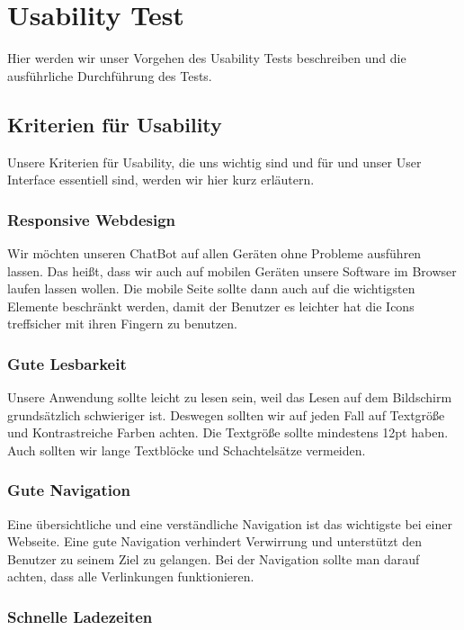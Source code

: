 \section{Usability Test}
Hier werden wir unser Vorgehen des Usability Tests beschreiben und die ausführliche
Durchführung des Tests.

\subsection{Kriterien für Usability}
Unsere Kriterien für Usability, die uns wichtig sind und für und unser User Interface
essentiell sind, werden wir hier kurz erläutern.

\subsubsection{Responsive Webdesign}

\noindent Wir möchten unseren ChatBot auf allen Geräten ohne Probleme ausführen lassen.
Das heißt, dass wir auch auf mobilen Geräten unsere Software im Browser laufen lassen wollen.
Die mobile Seite sollte dann auch auf die wichtigsten Elemente beschränkt werden, damit
der Benutzer es leichter hat die Icons treffsicher mit ihren Fingern zu benutzen.

\subsubsection{Gute Lesbarkeit}

\noindent Unsere Anwendung sollte leicht zu lesen sein, weil das Lesen auf dem Bildschirm
grundsätzlich schwieriger ist. Deswegen sollten wir auf jeden Fall
auf Textgröße und Kontrastreiche Farben achten. Die Textgröße sollte mindestens
12pt haben. Auch sollten wir lange Textblöcke und
Schachtelsätze vermeiden.

\subsubsection{Gute Navigation}

\noindent Eine übersichtliche und eine verständliche Navigation ist das wichtigste bei einer Webseite.
Eine gute Navigation verhindert Verwirrung und unterstützt den Benutzer zu seinem Ziel zu gelangen.
Bei der Navigation sollte man darauf achten, dass alle Verlinkungen funktionieren.

\subsubsection{Schnelle Ladezeiten}

